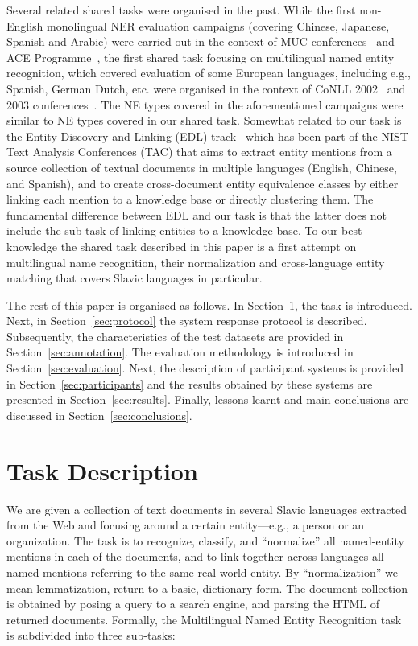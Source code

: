 \documentclass[11pt]{article}
\begin{document}
Several related shared tasks were organised in the past. While the first non-English monolingual 
NER evaluation campaigns (covering Chinese, Japanese, Spanish and Arabic) were carried out in the 
context of MUC conferences~\cite{chinchor:98} and ACE Programme~\cite{conf/lrec/DoddingtonMPRSW04},
the first shared task focusing on multilingual named entity recognition, which covered evaluation of
some European languages, including e.g., Spanish, German Dutch, etc. were organised in the context of
CoNLL 2002~\cite{TjongKimSang:2002:ICS:1118853.1118877} and 2003 conferences~\cite{TjongKimSang:2002:ICS:1118853.1118877}.
The NE types covered in the aforementioned campaigns were similar to NE types covered in our
shared task. Somewhat related to our task is the Entity Discovery and Linking (EDL) track~\cite{ji:ea:2014,ji:ea:2015} 
which has been part of the NIST Text Analysis Conferences (TAC) that aims to extract entity mentions 
from a source collection of textual documents in multiple languages (English, Chinese, and Spanish), 
and to create cross-document entity equivalence classes by either linking each mention to a knowledge base or
directly clustering them. The fundamental difference between EDL and our task
is that the latter does not include the sub-task of linking entities to a knowledge base. 
To our best knowledge the shared task described in this paper is a first attempt on multilingual
name recognition, their normalization and cross-language entity matching that covers Slavic
languages in particular.

The rest of this paper is organised as follows. In Section~\ref{sec:task}, the task is
introduced.  Next, in Section~\ref{sec:protocol} the system response
protocol is described.  Subsequently, the characteristics of the test
datasets are provided in Section~\ref{sec:annotation}.  The evaluation
methodology is introduced in Section~\ref{sec:evaluation}.  Next, the
description of participant systems is provided in
Section~\ref{sec:participants} and the results obtained by these systems
are presented in Section~\ref{sec:results}.  Finally, lessons learnt and
main conclusions are discussed in Section~\ref{sec:conclusions}.

\section{Task Description}
\label{sec:task}


We are given a collection of text documents in several Slavic languages
extracted from the Web and focusing around a certain entity---e.g., a
person or an organization.  The task is to recognize, classify, and
``normalize'' all named-entity mentions in each of the documents, and to
link together across languages all named mentions referring to the same
real-world entity.  By ``normalization'' we mean lemmatization, return to
a basic, dictionary form.  The document collection is obtained by posing
a query to a search engine, and parsing the HTML of returned documents.
Formally, the Multilingual Named Entity Recognition task is
subdivided into three sub-tasks:
\end{document}
